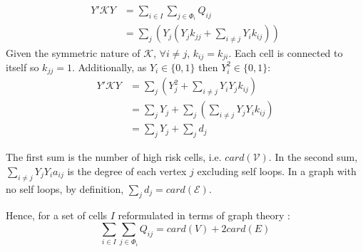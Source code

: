 \begin{align*}
    Y' \mathcal{K} Y &=\sum_{i \in I}\sum_{j \in \Phi_i}Q_{ij}\\
					 &= \sum_j\left( Y_j \left( Y_j k_{jj} + \sum_{i \neq j}Y_i k_{ij}\right)\right)
\end{align*}
Given the symmetric nature of $\mathcal{K}$, $\forall i \neq j$, $k_{ij}=k_{ji}$. Each cell is connected to itself so $k_{jj}=1$. Additionally, as $Y_i\in\{0,1\}$ then $Y_i^2 \in \{0,1\}$:
\begin{align*}
    Y'\mathcal{K} Y & =\sum_j \left(Y_j^2 + \sum_{i\neq j}Y_i Y_j k_{ij}\right)\\ 
          & = \sum_j Y_j + \sum_{j} \left(\sum_{i \neq j }Y_j Y_i k_{ij}\right)   \\
          & = \sum_j Y_j + \sum_{j} d_{j}
\end{align*}

The first sum is the number of high risk cells, i.e. $card(\mathcal{V})$. 
In the second sum, $\sum_{i \neq j} Y_j Y_i a_{ij}$ is the degree of each vertex $j$ excluding self loops. In a graph with no self loops, by definition, $\sum_{j} d_j = card(\mathcal{E})$.

Hence, for a set of cells $I$ reformulated in terms of graph theory : 
\begin{equation}
        \sum_{i \in I}\sum_{j \in \Phi_i}Q_{ij} = card(V) + 2 card(E)
\end{equation}

